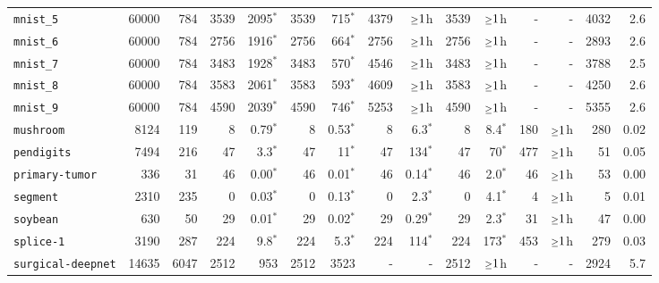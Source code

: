 \begin{tabular}{lccrrrrrrrrrrrr}
\texttt{mnist\_5} & \multicolumn{1}{r}{60000} & \multicolumn{1}{r}{784}  & 3539 & 2095$^*$ & 3539 & 715$^*$ & 4379 & $\mathsmaller{\geq}1$h & 3539 & $\mathsmaller{\geq}1$h & - & - & 4032 & 2.6\\
\texttt{mnist\_6} & \multicolumn{1}{r}{60000} & \multicolumn{1}{r}{784}  & 2756 & 1916$^*$ & 2756 & 664$^*$ & 2756 & $\mathsmaller{\geq}1$h & 2756 & $\mathsmaller{\geq}1$h & - & - & 2893 & 2.6\\
\texttt{mnist\_7} & \multicolumn{1}{r}{60000} & \multicolumn{1}{r}{784}  & 3483 & 1928$^*$ & 3483 & 570$^*$ & 4546 & $\mathsmaller{\geq}1$h & 3483 & $\mathsmaller{\geq}1$h & - & - & 3788 & 2.5\\
\texttt{mnist\_8} & \multicolumn{1}{r}{60000} & \multicolumn{1}{r}{784}  & 3583 & 2061$^*$ & 3583 & 593$^*$ & 4609 & $\mathsmaller{\geq}1$h & 3583 & $\mathsmaller{\geq}1$h & - & - & 4250 & 2.6\\
\texttt{mnist\_9} & \multicolumn{1}{r}{60000} & \multicolumn{1}{r}{784}  & 4590 & 2039$^*$ & 4590 & 746$^*$ & 5253 & $\mathsmaller{\geq}1$h & 4590 & $\mathsmaller{\geq}1$h & - & - & 5355 & 2.6\\
\texttt{mushroom} & \multicolumn{1}{r}{8124} & \multicolumn{1}{r}{119}  & 8 & 0.79$^*$ & 8 & 0.53$^*$ & 8 & 6.3$^*$ & 8 & 8.4$^*$ & 180 & $\mathsmaller{\geq}1$h & 280 & 0.02\\
\texttt{pendigits} & \multicolumn{1}{r}{7494} & \multicolumn{1}{r}{216}  & 47 & 3.3$^*$ & 47 & 11$^*$ & 47 & 134$^*$ & 47 & 70$^*$ & 477 & $\mathsmaller{\geq}1$h & 51 & 0.05\\
\texttt{primary-tumor} & \multicolumn{1}{r}{336} & \multicolumn{1}{r}{31}  & 46 & 0.00$^*$ & 46 & 0.01$^*$ & 46 & 0.14$^*$ & 46 & 2.0$^*$ & 46 & $\mathsmaller{\geq}1$h & 53 & 0.00\\
\texttt{segment} & \multicolumn{1}{r}{2310} & \multicolumn{1}{r}{235}  & 0 & 0.03$^*$ & 0 & 0.13$^*$ & 0 & 2.3$^*$ & 0 & 4.1$^*$ & 4 & $\mathsmaller{\geq}1$h & 5 & 0.01\\
\texttt{soybean} & \multicolumn{1}{r}{630} & \multicolumn{1}{r}{50}  & 29 & 0.01$^*$ & 29 & 0.02$^*$ & 29 & 0.29$^*$ & 29 & 2.3$^*$ & 31 & $\mathsmaller{\geq}1$h & 47 & 0.00\\
\texttt{splice-1} & \multicolumn{1}{r}{3190} & \multicolumn{1}{r}{287}  & 224 & 9.8$^*$ & 224 & 5.3$^*$ & 224 & 114$^*$ & 224 & 173$^*$ & 453 & $\mathsmaller{\geq}1$h & 279 & 0.03\\
\texttt{surgical-deepnet} & \multicolumn{1}{r}{14635} & \multicolumn{1}{r}{6047}  & 2512 & 953 & 2512 & 3523 & - & - & 2512 & $\mathsmaller{\geq}1$h & - & - & 2924 & 5.7\\

\end{tabular}
